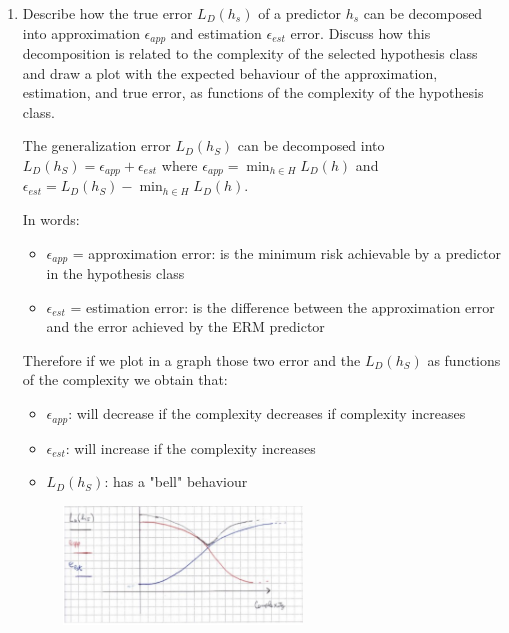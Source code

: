 \documentclass[a4paper,11pt,oneside]{book}
\begin{document}
\begin{enumerate}
\item Describe how the true error $L_D(h_s)$ of a predictor $h_s$ can be decomposed into approximation $\epsilon_{app}$ and estimation $\epsilon_{est}$ error. Discuss how this decomposition is related to the complexity of the selected hypothesis class and draw a plot with the expected behaviour of the approximation, estimation, and true error, as functions of the complexity of the hypothesis class.
    \begin{solution}
        The generalization error $L_D(h_S)$ can be decomposed into $L_D(h_S) = \epsilon_{app} + \epsilon_{est}$ where $\epsilon_{app} = \min_{h\in H}L_D(h)$ and $\epsilon_{est} = L_D(h_S) - \min_{h\in H}L_D(h)$.
        
        In words:
        \begin{itemize}
        \item $\epsilon_{app}$ = approximation error: is the minimum risk achievable by a predictor in the hypothesis class
        \item $\epsilon_{est}$ = estimation error: is the difference between the approximation error and the error achieved by the ERM predictor
        \end{itemize}
        
        Therefore if we plot in a graph those two error and the $L_D(h_S)$ as functions of the complexity we obtain that:
        \begin{itemize}
        \item $\epsilon_{app}$: will decrease if the complexity decreases if complexity increases
        \item $\epsilon_{est}$: will increase if the complexity increases
        \item $L_D(h_S)$: has a "bell" behaviour
        \end{itemize}
        
        \begin{figure}[H]
        \centering
        \includegraphics[width=0.6\textwidth]{images/1_3_29_June_2020.png}
        \end{figure}
    

\end{solution}
\end{enumerate}
\end{document}
